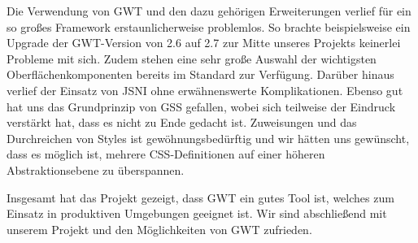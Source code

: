 Die Verwendung von GWT und den dazu gehörigen Erweiterungen verlief für ein so großes Framework erstaunlicherweise problemlos.
So brachte beispielsweise ein Upgrade der GWT-Version von 2.6 auf 2.7 zur Mitte unseres Projekts keinerlei Probleme mit sich. Zudem stehen eine sehr große Auswahl der wichtigsten Oberflächenkomponenten bereits im Standard zur Verfügung. Darüber hinaus verlief der Einsatz von JSNI  ohne erwähnenswerte Komplikationen. Ebenso gut hat uns das Grundprinzip von GSS gefallen, wobei sich teilweise der Eindruck verstärkt hat, dass es nicht zu Ende gedacht ist. Zuweisungen und das Durchreichen von Styles ist gewöhnungsbedürftig und wir hätten uns gewünscht, dass es möglich ist, mehrere CSS-Definitionen auf einer höheren Abstraktionsebene zu überspannen.

Insgesamt hat das Projekt gezeigt, dass GWT ein gutes Tool ist, welches zum Einsatz in produktiven Umgebungen geeignet ist. Wir sind abschließend mit unserem Projekt und den Möglichkeiten von GWT zufrieden.

